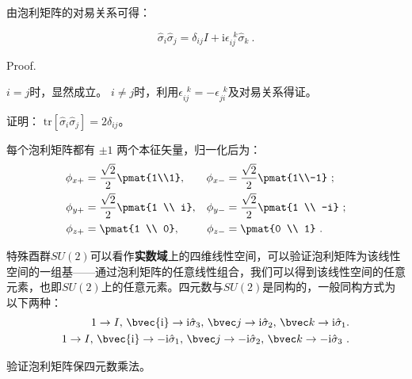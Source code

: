 由泡利矩阵的对易关系可得：
\begin{theorem}{}
\begin{equation}\label{eq_pauliM_1}
\hat{\sigma}_i\hat{\sigma}_j = \delta_{ij}I + \mathrm{i}\epsilon ^{\,\,\, k}_{ij}\hat{\sigma}_k~.
\end{equation}
\end{theorem}
Proof.

$i=j$时，显然成立。
$i\neq j$时，利用$\epsilon ^{\,\,\, k}_{ij}=-\epsilon ^{\,\,\, k}_{ji}$及对易关系得证。


\begin{exercise}{}
证明：
$\mathrm{tr}[\hat{\sigma}_i \hat{\sigma}_j]= 2\delta_{ij}$。
\end{exercise}

每个泡利矩阵都有 $\pm 1$ 两个本征矢量，归一化后为：
\begin{equation}
\begin{aligned}
\phi_{x+} &= \frac{\sqrt 2}{2}\pmat{1\\1}, &\phi_{x-} &= \frac{\sqrt 2}{2} \pmat{1\\-1}~;\\
\phi_{y+} &= \frac{\sqrt 2}{2}\pmat{1 \\ i}, &\phi_{y-} &= \frac{\sqrt 2}{2} \pmat{1 \\ -i} ~;\\
\phi_{z+} &= \pmat{1 \\ 0}, &\phi_{z-} &= \pmat{0 \\ 1}~.
\end{aligned}
\end{equation}

特殊酉群$SU(2)$可以看作\textbf{实数域}上的四维线性空间，可以验证泡利矩阵为该线性空间的一组基——通过泡利矩阵的任意线性组合，我们可以得到该线性空间的任意元素，也即$SU(2)$上的任意元素。四元数与$SU(2)$是同构的，一般同构方式为以下两种：
\begin{equation}
\begin{aligned}
1\rightarrow I,\,\bvec{\mathrm i}\rightarrow \mathrm i \hat{\sigma}_3,\,\bvec j\rightarrow \mathrm i\hat{\sigma}_2,\,\bvec k\rightarrow \mathrm i\hat{\sigma}_1.\\
1\rightarrow I,\,\bvec{\mathrm i}\rightarrow -\mathrm i\hat{\sigma}_1,\,\bvec j\rightarrow -\mathrm i\hat{\sigma}_2,\,\bvec k\rightarrow -\mathrm i\hat{\sigma}_3~.
\end{aligned}
\end{equation}

\begin{exercise}{}
验证泡利矩阵保四元数乘法。
\end{exercise}